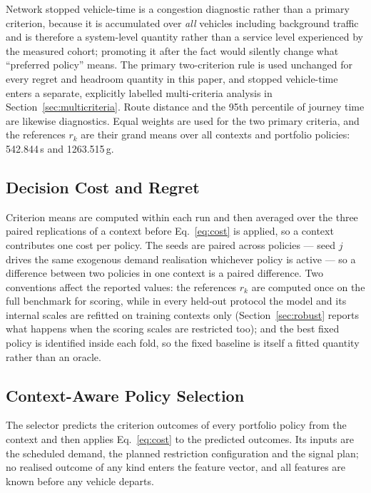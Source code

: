 Network stopped vehicle-time is a congestion diagnostic rather than a primary criterion,
because it is accumulated over \emph{all} vehicles including background traffic and is
therefore a system-level quantity rather than a service level experienced by the measured
cohort; promoting it after the fact would silently change what ``preferred policy'' means.
The primary two-criterion rule is used unchanged for every regret and headroom quantity in
this paper, and stopped vehicle-time enters a separate, explicitly labelled multi-criteria
analysis in Section~\ref{sec:multicriteria}. Route distance and the 95th percentile of
journey time are likewise diagnostics. Equal weights are used for the two primary
criteria, and the references $r_k$ are their grand means over all contexts and portfolio
policies: 542.844\,s and 1263.515\,g.

\subsection{Decision Cost and Regret}

Criterion means are computed within each run and then averaged over the three paired
replications of a context before Eq.~\eqref{eq:cost} is applied, so a context contributes
one cost per policy. The seeds are paired across policies --- seed $j$ drives the same
exogenous demand realisation whichever policy is active --- so a difference between two
policies in one context is a paired difference. Two conventions affect the reported
values: the references $r_k$ are computed once on the full benchmark for scoring, while in
every held-out protocol the model and its internal scales are refitted on training
contexts only (Section~\ref{sec:robust} reports what happens when the scoring scales are
restricted too); and the best fixed policy is identified inside each fold, so the fixed
baseline is itself a fitted quantity rather than an oracle.

\subsection{Context-Aware Policy Selection}

The selector predicts the criterion outcomes of every portfolio policy from the context
and then applies Eq.~\eqref{eq:cost} to the predicted outcomes. Its inputs are the
scheduled demand, the planned restriction configuration and the signal plan; no realised
outcome of any kind enters the feature vector, and all features are known before any
vehicle departs.

